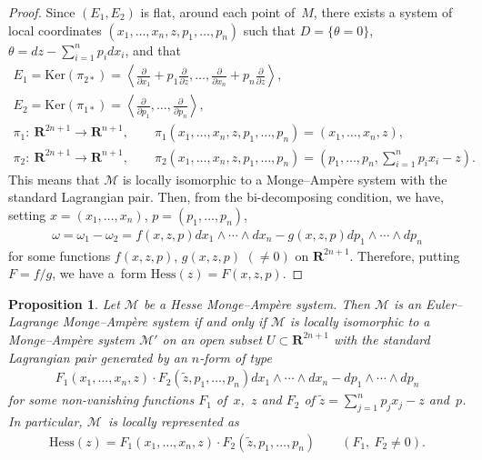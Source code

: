 \documentclass[pdftex]{sigma}
\newtheorem{Prop}[Th]{Proposition}
\begin{document}
\begin{proof}
Since $(E_1,E_2)$ is f\/lat, around each point of~$M$,
there exists a system
of local coordinates
$
(x_1,\dots,x_n,z,p_1,\dots,p_n)
$
such that
$D =\{ \theta = 0 \}$, $\theta=dz-\sum\limits_{i=1}^np_idx_i$, and that
\begin{gather*}
E_1 =\mathrm{Ker}({\pi}_{2*})=\left\langle \frac{\partial}{\partial x_1}+
p_1\frac{\partial}{\partial z},
\dots,\frac{\partial}{\partial x_n}+p_n\frac{\partial}{\partial z}\right\rangle,
\\
E_2 =\mathrm{Ker}({\pi}_{1*})=\left\langle \frac{\partial}{\partial p_1},\dots,
\frac{\partial}{\partial p_n}\right\rangle,
\\
{\pi}_1 \colon  \  {\mathbf{R}}^{2n+1} \to {\mathbf{R}}^{n+1}, \qquad \pi_1(x_1, \dots, x_n, z,
p_1, \dots, p_n)=(x_1, \dots, x_n, z),
\\
{\pi}_2 \colon   \ {\mathbf{R}}^{2n+1} \to {\mathbf{R}}^{n+1},
\qquad
{\pi}_2(x_1, \dots, x_n, z, p_1, \dots, p_n) =
\left(p_1, \dots, p_n, \sum_{i=1}^np_ix_i-z\right).
\end{gather*}
This means that $\mathcal{M}$ is locally isomorphic to
a Monge--Amp{\`e}re system with the standard Lag\-rangian pair.
Then, from the bi-decomposing condition,
we have, setting $x = (x_1, \dots, x_n)$, $p = (p_1, \dots, p_n)$,
\begin{gather*}
\omega  = \omega_1-\omega_2
 =f(x,z,p)dx_1\wedge \cdots \wedge dx_n -
g(x,z,p)dp_1\wedge \cdots \wedge dp_n
\end{gather*}
for some functions $f(x,z,p)$, $g(x,z,p)$ $(\not=0)$ on
${\mathbf{R}}^{2n+1}$.
Therefore, putting $F=f/g$,
we have a~form $\mathrm{Hess}(z) = F(x,z,p)$.
\end{proof}


\begin{Prop}
\label{E-L-MA}
Let $\mathcal{M}$ be a Hesse Monge--Amp{\`e}re system.
Then $\mathcal{M}$ is an Euler--Lagrange Monge--Amp{\`e}re system
if and only if
$\mathcal{M}$ is locally isomorphic to a Monge--Amp{\`e}re system $\mathcal{M}'$
on an open subset $U \subset {\mathbf{R}}^{2n+1}$ with the standard Lagrangian pair generated by an $n$-form
of type
\begin{gather*}
F_1(x_1, \dots, x_n, z)\cdot F_2(\widetilde{z}, p_1, \dots, p_n)
dx_1\wedge\cdots\wedge dx_n - dp_1\wedge\cdots\wedge dp_n
\end{gather*}
for some non-vanishing functions $F_1$ of~$x$,~$z$ and $F_2$ of $\widetilde{z} = \sum\limits_{j=1}^n p_jx_j-z$
and~$p$.
In particular, ${\mathcal M}$~is locally represented as
\begin{gather*}
\mathrm{Hess}(z) =
F_1(x_1, \dots, x_n, z)\cdot F_2(\widetilde{z}, p_1, \dots, p_n)
\qquad
(F_1,\ F_2\not=0).
\end{gather*}
\end{Prop}
\end{document}
